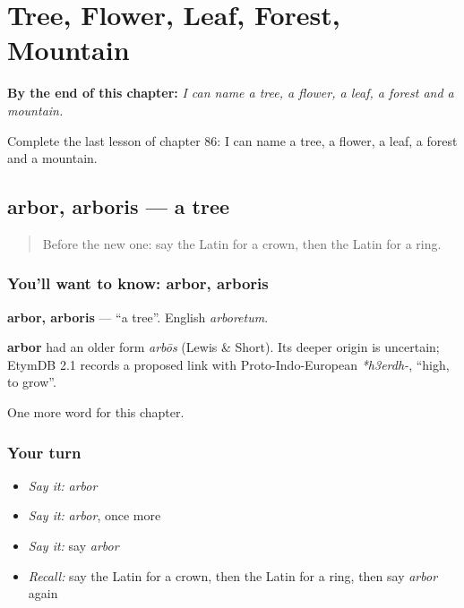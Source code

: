 
\chapter{Tree, Flower, Leaf, Forest, Mountain}
\label{ch:la-tree-flower-leaf-forest-mountain}

\begin{chapteropening}
\textbf{By the end of this chapter:} \emph{I can name a tree, a flower, a leaf, a forest and a mountain.}

Complete the last lesson of chapter 86: I can name a tree, a flower, a leaf, a forest and a mountain.
\end{chapteropening}

\section[arbor, arboris]{arbor, arboris — a tree}

\label{lesson:LA-C86-arbor}



\begin{quote}
Before the new one: say the Latin for a crown, then the Latin for a ring.
\end{quote}

\subsection*{You'll want to know: arbor, arboris}
\textbf{arbor, arboris} — \textquotedblleft{}a tree\textquotedblright{}. English \emph{arboretum}.

\begin{cousinweb}
\textbf{arbor} had an older form \emph{arbōs} (Lewis \& Short). Its deeper origin is uncertain; EtymDB 2.1 records a proposed link with Proto-Indo-European \emph{*h3erdh-}, \textquotedblleft{}high, to grow\textquotedblright{}.
\end{cousinweb}

\begin{grammarlens}[title={What you've built}]
One more word for this chapter.
\end{grammarlens}

\subsection*{Your turn}
\begin{itemize}
\raggedright
  \item \emph{Say it:} \emph{arbor}
  \item \emph{Say it:} \emph{arbor}, once more
  \item \emph{Say it:} say \emph{arbor}
  \item \emph{Recall:} say the Latin for a crown, then the Latin for a ring, then say \emph{arbor} again
\end{itemize}

